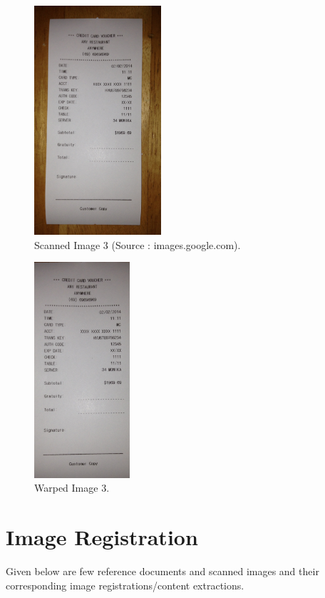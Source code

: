 \pagebreak

\begin{figure}[th]
	\centering
	\includegraphics[height=8.5cm ]{Figures/scanned_image3}
	\caption[Scanned Image 3]{Scanned Image 3 (Source : images.google.com).}
	\label{fig:ScannedImage3}
\end{figure}

\begin{figure}[th]
	\centering
	\includegraphics[height=8cm ]{Figures/warped_image3}
	\caption[Warped Image 3]{Warped Image 3.}
	\label{fig:WarpedImage3}
\end{figure}

\pagebreak

\section{Image Registration}

Given below are few reference documents and scanned images and their corresponding image registrations/content extractions.

